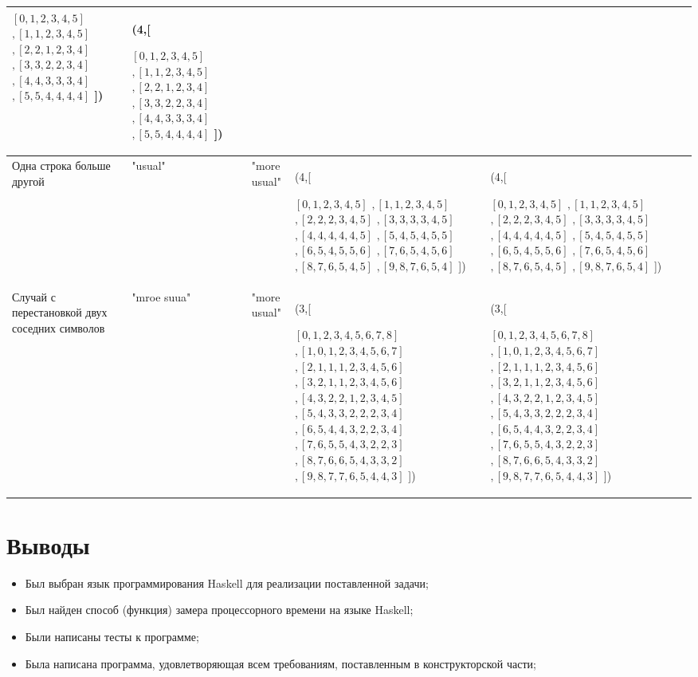 \documentclass[12pt]{report}
\begin{document}
\begin{center}
\begin{longtable}[H]{|p{2cm}|p{1.5cm}|p{1.5cm}|p{4.7cm}|p{4.7cm}|c|}
		$[0,1,2,3,4,5]$
		$,[1,1,2,3,4,5]$
		$,[2,2,1,2,3,4]$
		$,[3,3,2,2,3,4]$
		$,[4,4,3,3,3,4]$
		$,[5,5,4,4,4,4]$
		]) & (4,[
		
		$[0,1,2,3,4,5]$
		$,[1,1,2,3,4,5]$
		$,[2,2,1,2,3,4]$
		$,[3,3,2,2,3,4]$
		$,[4,4,3,3,3,4]$
		$,[5,5,4,4,4,4]$
		]) & \checkmark\\
		\hline
		Одна строка больше другой & "usual" & "more
		usual" & (4,[
		
		$[0,1,2,3,4,5]$
		$,[1,1,2,3,4,5]$
		$,[2,2,2,3,4,5]$
		$,[3,3,3,3,4,5]$
		$,[4,4,4,4,4,5]$
		$,[5,4,5,4,5,5]$
		$,[6,5,4,5,5,6]$
		$,[7,6,5,4,5,6]$
		$,[8,7,6,5,4,5]$
		$,[9,8,7,6,5,4]$
		]) & (4,[
		
		$[0,1,2,3,4,5]$
		$,[1,1,2,3,4,5]$
		$,[2,2,2,3,4,5]$
		$,[3,3,3,3,4,5]$
		$,[4,4,4,4,4,5]$
		$,[5,4,5,4,5,5]$
		$,[6,5,4,5,5,6]$
		$,[7,6,5,4,5,6]$
		$,[8,7,6,5,4,5]$
		$,[9,8,7,6,5,4]$
		]) & \checkmark\\
		\hline
		Случай с перестановкой двух соседних символов & "mroe
		suua" & "more
		usual" & (3,[
		
		$[0,1,2,3,4,5,6,7,8]$
		$,[1,0,1,2,3,4,5,6,7]$
		$,[2,1,1,1,2,3,4,5,6]$
		$,[3,2,1,1,2,3,4,5,6]$
		$,[4,3,2,2,1,2,3,4,5]$
		$,[5,4,3,3,2,2,2,3,4]$
		$,[6,5,4,4,3,2,2,3,4]$
		$,[7,6,5,5,4,3,2,2,3]$
		$,[8,7,6,6,5,4,3,3,2]$
		$,[9,8,7,7,6,5,4,4,3]$
		]) & (3,[
		
		$[0,1,2,3,4,5,6,7,8]$
		$,[1,0,1,2,3,4,5,6,7]$
		$,[2,1,1,1,2,3,4,5,6]$
		$,[3,2,1,1,2,3,4,5,6]$
		$,[4,3,2,2,1,2,3,4,5]$
		$,[5,4,3,3,2,2,2,3,4]$
		$,[6,5,4,4,3,2,2,3,4]$
		$,[7,6,5,5,4,3,2,2,3]$
		$,[8,7,6,6,5,4,3,3,2]$
		$,[9,8,7,7,6,5,4,4,3]$
		]) & \checkmark\\
		\hline
	\end{longtable}
\end{center}


\section{Выводы}

\begin{itemize}
	\item Был выбран язык программирования Haskell для реализации поставленной задачи;
	\item Был найден способ (функция) замера процессорного времени на языке Haskell;
	\item Были написаны тесты к программе;
	\item Была написана программа, удовлетворяющая всем требованиям, поставленным в конструкторской части;
\end{itemize}
        
\end{document}
